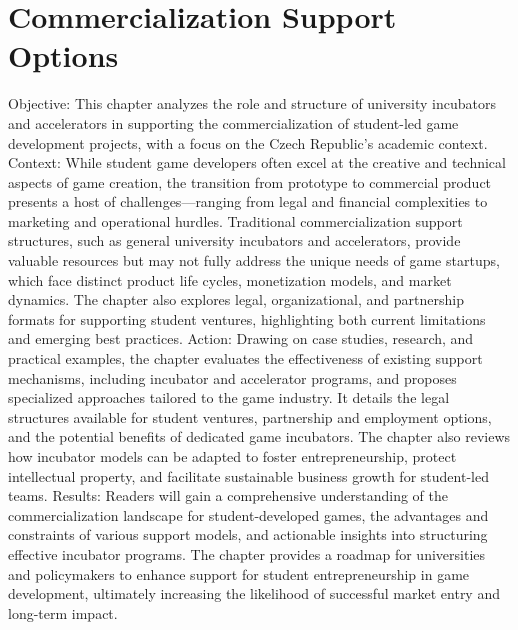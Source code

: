 \chapter{Commercialization Support Options}

\begin{chapterabstract}
    Objective:
    This chapter analyzes the role and structure of university incubators and accelerators in supporting the commercialization of student-led game development projects, with a focus on the Czech Republic’s academic context.
    Context:
    While student game developers often excel at the creative and technical aspects of game creation, the transition from prototype to commercial product presents a host of challenges—ranging from legal and financial complexities to marketing and operational hurdles. Traditional commercialization support structures, such as general university incubators and accelerators, provide valuable resources but may not fully address the unique needs of game startups, which face distinct product life cycles, monetization models, and market dynamics. The chapter also explores legal, organizational, and partnership formats for supporting student ventures, highlighting both current limitations and emerging best practices.
    Action:
    Drawing on case studies, research, and practical examples, the chapter evaluates the effectiveness of existing support mechanisms, including incubator and accelerator programs, and proposes specialized approaches tailored to the game industry. It details the legal structures available for student ventures, partnership and employment options, and the potential benefits of dedicated game incubators. The chapter also reviews how incubator models can be adapted to foster entrepreneurship, protect intellectual property, and facilitate sustainable business growth for student-led teams.
    Results:
    Readers will gain a comprehensive understanding of the commercialization landscape for student-developed games, the advantages and constraints of various support models, and actionable insights into structuring effective incubator programs. The chapter provides a roadmap for universities and policymakers to enhance support for student entrepreneurship in game development, ultimately increasing the likelihood of successful market entry and long-term impact.
\end{chapterabstract}

